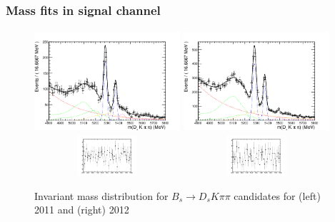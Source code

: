 \documentclass[]{beamer}
\begin{document}
\begin{frame}
\frametitle{Mass fits in signal channel}

\begin{figure}
\includegraphics[width=5.4cm,height=3.8cm]{pics/BmassFit_11}
\includegraphics[width=5.4cm,height=3.8cm]{pics/BmassFit_12}\\
\includegraphics[width=5.4cm,height=1.5cm]{pics/pull_11}
\includegraphics[width=5.4cm,height=1.5cm]{pics/pull_12}
\caption{Invariant mass distribution for $B_{s}\rightarrow D_{s} K\pi\pi$ candidates for (left) 2011 and (right) 2012}
\end{figure}


\end{frame}
\end{document}
